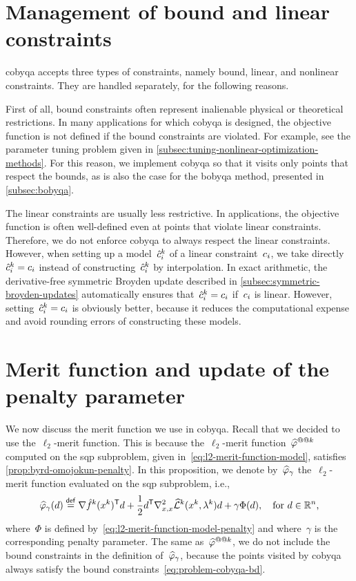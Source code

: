 \section{Management of bound and linear constraints}
\label{sec:simple-constraints}

\Gls{cobyqa} accepts three types of constraints, namely bound, linear, and nonlinear constraints.
They are handled separately, for the following reasons.

First of all, bound constraints often represent inalienable physical or theoretical restrictions.
In many applications for which \gls{cobyqa} is designed, the objective function is not defined if the bound constraints are violated.
For example, see the parameter tuning problem given in \cref{subsec:tuning-nonlinear-optimization-methods}.
For this reason, we implement \gls{cobyqa} so that it visits only points that respect the bounds, as is also the case for the \gls{bobyqa} method, presented in \cref{subsec:bobyqa}.

The linear constraints are usually less restrictive.
In applications, the objective function is often well-defined even at points that violate linear constraints.
Therefore, we do not enforce \gls{cobyqa} to always respect the linear constraints.
However, when setting up a model~$\conm[k]{i}$ of a linear constraint~$c_{i}$, we take directly~$\conm[k]{i} = \con{i}$ instead of constructing~$\conm[k]{i}$ by interpolation.
In exact arithmetic, the derivative-free symmetric Broyden update described in \cref{subsec:symmetric-broyden-updates} automatically ensures that~$\conm[k]{i} = \con{i}$ if~$c_{i}$ is linear. 
However, setting~$\conm[k]{i} = \con{i}$ is obviously better, because it reduces the computational expense and avoid rounding errors of constructing these models.

\section{Merit function and update of the penalty parameter}
\label{sec:cobyqa-merit-penalty}

We now discuss the merit function we use in \gls{cobyqa}.
Recall that we decided to use the~$\ell_2$-merit function.
This is because the~$\ell_2$-merit function~$\meritm[k]$ computed on the \gls{sqp} subproblem, given in~\cref{eq:l2-merit-function-model}, satisfies \cref{prop:byrd-omojokun-penalty}.
In this proposition, we denote by~$\meritm_{\gamma}$ the~$\ell_2$-merit function evaluated on the \gls{sqp} subproblem, i.e.,
\begin{equation*}
    \meritm_{\gamma}(\step) \eqdef \nabla \objm[k](\iter[k])^{\T} \step + \frac{1}{2} \step^{\T} \nabla_{x, x}^2 \lagm[k](\iter[k], \lm[k]) \step + \gamma \Phi(\step), \quad \text{for~$\step \in \R^n$,}
\end{equation*}
where~$\Phi$ is defined by~\cref{eq:l2-merit-function-model-penalty} and where~$\gamma$ is the corresponding penalty parameter.
The same as~$\meritm[k]$, we do not include the bound constraints in the definition of~$\meritm_{\gamma}$, because the points visited by \gls{cobyqa} always satisfy the bound constraints~\cref{eq:problem-cobyqa-bd}.

